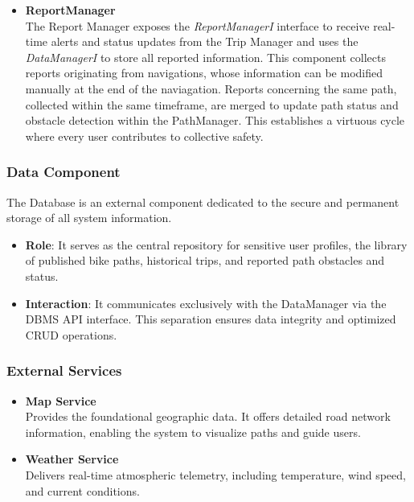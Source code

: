 \begin{itemize}
\begin{enumerate}
    \end{enumerate}
    \item \textbf{ReportManager}\vspace{0.3mm}\\
    The Report Manager exposes the \textit{ReportManagerI} interface to receive real-time alerts and status updates from the Trip Manager and uses the \textit{DataManagerI} to store all reported information. This component collects reports originating from navigations, whose information can be modified manually at the end of the naviagation. Reports concerning the same path, collected within the same timeframe, are merged to update path status and obstacle detection within the PathManager. This establishes a virtuous cycle where every user contributes to collective safety.
\end{itemize}

\newpage
\subsubsection{Data Component}

The Database is an external component dedicated to the secure and permanent storage of all system information.

\begin{itemize}
    \item \textbf{Role}: It serves as the central repository for sensitive user profiles, the library of published bike paths, historical trips, and reported path obstacles and status.
    
    \item \textbf{Interaction}: It communicates exclusively with the DataManager via the DBMS API interface. This separation ensures data integrity and optimized CRUD operations.
    
\end{itemize}

\subsubsection{External Services}
\begin{itemize}
    \item \textbf{Map Service}\vspace{0.3mm}\\
    Provides the foundational geographic data. It offers detailed road network information, enabling the system to visualize paths and guide users.
    \item \textbf{Weather Service}\vspace{0.3mm}\\
    Delivers real-time atmospheric telemetry, including temperature, wind speed, and current conditions.
\end{itemize}

